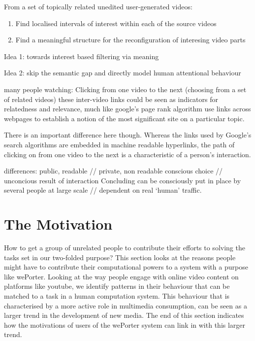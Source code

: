 From a set of topically related unedited user-generated videos:
\begin{enumerate}
  \item Find localised intervals of interest within each of the source videos
  \item Find a meaningful structure for the reconfiguration of interesing video parts
\end{enumerate}






Idea 1: towards interest based filtering via meaning

Idea 2: skip the semantic gap and directly model human attentional behaviour



many people watching:
Clicking from one video to the next (choosing from a set of related videos)
these inter-video links could be seen as indicators for relatedness and relevance, much like google's page rank algorithm use links across webpages to establish a notion of the most significant site on a particular topic. 

There is an important difference here though. Whereas the links used by Google's search algorithms are embedded in machine readable hyperlinks, the path of clicking on from one video to the next is a characteristic of a person's interaction. 

differences:
	public, readable // private, non readable
	conscious choice // unconcious result of interaction
	Concluding
		can be consciously put in place by several people at large scale // dependent on real `human' traffic.
		

\section{The Motivation}

How to get a group of unrelated people to contribute their efforts to solving the tasks set in our two-folded purpose? This section looks at the reasons people might have to contribute their computational powers to a system with a purpose like wePorter. Looking at the way people engage with online video content on platforms like youtube, we identify patterns in their behaviour that can be matched to a task in a human computation system. This behaviour that is characterised by a more active role in multimedia consumption, can be seen as a larger trend in the development of new media. The end of this section indicates how the motivations of users of the wePorter system can link in with this larger trend. 

